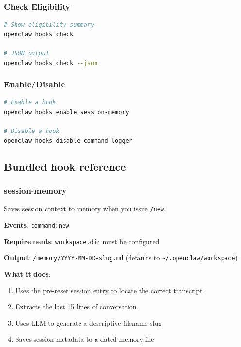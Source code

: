 \subsubsection{Check Eligibility}


\begin{lstlisting}[language=bash]
# Show eligibility summary
openclaw hooks check

# JSON output
openclaw hooks check --json
\end{lstlisting}


\subsubsection{Enable/Disable}


\begin{lstlisting}[language=bash]
# Enable a hook
openclaw hooks enable session-memory

# Disable a hook
openclaw hooks disable command-logger
\end{lstlisting}


\subsection{Bundled hook reference}


\subsubsection{session-memory}


Saves session context to memory when you issue \texttt{/new}.

\textbf{Events}: \texttt{command:new}

\textbf{Requirements}: \texttt{workspace.dir} must be configured

\textbf{Output}: \texttt{/memory/YYYY-MM-DD-slug.md} (defaults to \texttt{\textasciitilde{}/.openclaw/workspace})

\textbf{What it does}:

\begin{enumerate}
  \item Uses the pre-reset session entry to locate the correct transcript
  \item Extracts the last 15 lines of conversation
  \item Uses LLM to generate a descriptive filename slug
  \item Saves session metadata to a dated memory file
\end{enumerate}


